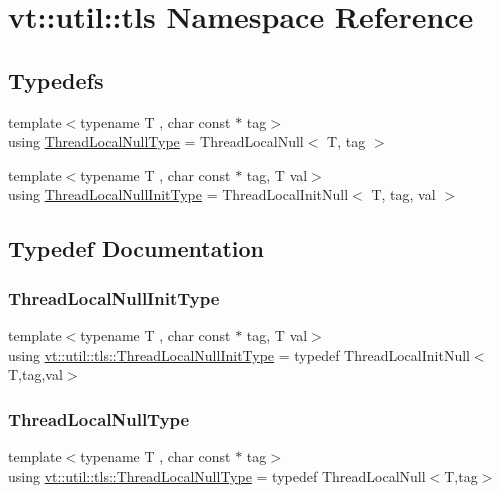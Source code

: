 \hypertarget{namespacevt_1_1util_1_1tls}{}\section{vt\+:\+:util\+:\+:tls Namespace Reference}
\label{namespacevt_1_1util_1_1tls}
\subsection*{Typedefs}
\begin{DoxyCompactItemize}
\item 
{\footnotesize template$<$typename T , char const $\ast$ tag$>$ }\\using \hyperlink{namespacevt_1_1util_1_1tls_aac9e7187a0a292093620b94d81a650eb}{Thread\+Local\+Null\+Type} = Thread\+Local\+Null$<$ T, tag $>$
\item 
{\footnotesize template$<$typename T , char const $\ast$ tag, T val$>$ }\\using \hyperlink{namespacevt_1_1util_1_1tls_a1c2a3e3055912db5cfa8df4b224d120c}{Thread\+Local\+Null\+Init\+Type} = Thread\+Local\+Init\+Null$<$ T, tag, val $>$
\end{DoxyCompactItemize}


\subsection{Typedef Documentation}
\mbox{\label{namespacevt_1_1util_1_1tls_a1c2a3e3055912db5cfa8df4b224d120c}} 
\subsubsection{\texorpdfstring{Thread\+Local\+Null\+Init\+Type}{ThreadLocalNullInitType}}
{\footnotesize\ttfamily template$<$typename T , char const $\ast$ tag, T val$>$ \\
using \hyperlink{namespacevt_1_1util_1_1tls_a1c2a3e3055912db5cfa8df4b224d120c}{vt\+::util\+::tls\+::\+Thread\+Local\+Null\+Init\+Type} = typedef Thread\+Local\+Init\+Null$<$T,tag,val$>$}

\mbox{\label{namespacevt_1_1util_1_1tls_aac9e7187a0a292093620b94d81a650eb}} 
\subsubsection{\texorpdfstring{Thread\+Local\+Null\+Type}{ThreadLocalNullType}}
{\footnotesize\ttfamily template$<$typename T , char const $\ast$ tag$>$ \\
using \hyperlink{namespacevt_1_1util_1_1tls_aac9e7187a0a292093620b94d81a650eb}{vt\+::util\+::tls\+::\+Thread\+Local\+Null\+Type} = typedef Thread\+Local\+Null$<$T,tag$>$}

